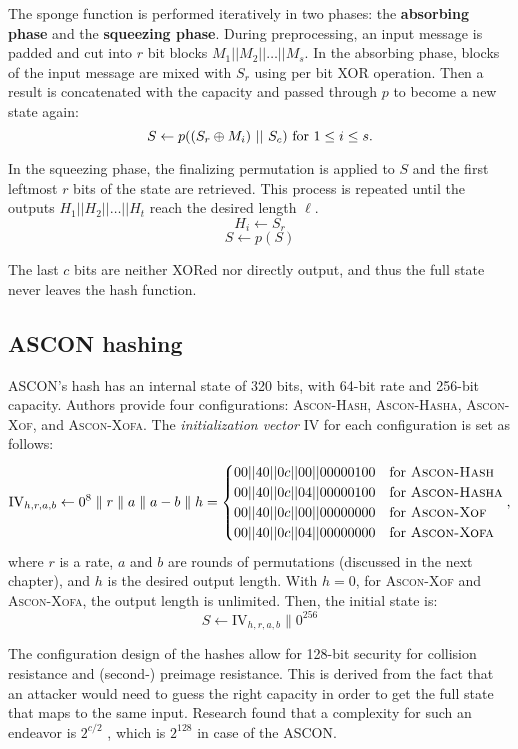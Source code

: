 The sponge function is performed iteratively in two phases: the \textbf{absorbing phase} and the \textbf{squeezing phase}. During preprocessing, an input message is padded and cut into $r$ bit blocks $M_1||M_2||\ldots||M_s$. In the absorbing phase, blocks of the input message are mixed with $S_r$ using per bit XOR operation. Then a result is concatenated with the capacity and passed through $p$ to become a new state again:
\begin{equation}
    S \leftarrow p((S_r \oplus M_i)~||~S_c)~\text{for}~1 \leq i \leq s. \notag
\end{equation}


In the squeezing phase, the finalizing permutation is applied to $S$ and the first leftmost $r$ bits of the state are retrieved. This process is repeated until the outputs $H_1||H_2||\ldots||H_t$ reach the desired length $\ell$.
\[
    H_i \leftarrow S_r
\]
\[
    S \leftarrow p(S)
\]

The last $c$ bits are neither XORed nor directly output, and thus the full state never leaves the hash function.

\subsection{ASCON hashing}
ASCON's hash has an internal state of 320 bits, with 64-bit rate and 256-bit capacity. Authors provide four configurations: \textsc{Ascon-Hash, Ascon-Hasha, Ascon-Xof}, and \textsc{Ascon-Xofa}. The \textit{initialization vector} IV for each configuration is set as follows:
\[
\text{IV}_{h,r,a,b} \leftarrow 0^8 \parallel r \parallel a \parallel a - b \parallel h =
\begin{cases}
    00||40||0c||00||00000100 & \text{for }\textsc{Ascon-Hash} \\
    00||40||0c||04||00000100 & \text{for }\textsc{Ascon-Hasha} \\
    00||40||0c||00||00000000 & \text{for }\textsc{Ascon-Xof} \\
    00||40||0c||04||00000000 & \text{for }\textsc{Ascon-Xofa} \\
\end{cases},
\]
where $r$ is a rate, $a$ and $b$ are rounds of permutations (discussed in the next chapter), and $h$ is the desired output length. With $h=0$, for \textsc{Ascon-Xof} and \textsc{Ascon-Xofa}, the output length is unlimited. Then, the initial state is:
\[
S \leftarrow \text{IV}_{h,r,a,b} \parallel 0^{256}
\]

The configuration design of the hashes allow for 128-bit security for collision resistance and (second-) preimage resistance. This is derived from the fact that an attacker would need to guess the right capacity in order to get the full state that maps to the same input. Research found that a complexity for such an endeavor is $2^{c/2}$ \cite{bertoniIndifferentiabilitySpongeConstruction2008}, which is $2^{128}$ in case of the ASCON.